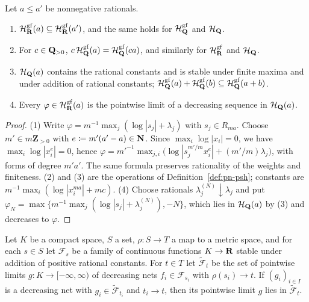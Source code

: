 \begin{lemma}\label{lem:bj-fs-basic}
\leanok
{}
Let $a\le a'$ be nonnegative rationals.
\begin{enumerate}
\item $\mathcal H^{\mathrm{gf}}_{\mathbf{R}}(a)\subseteq\mathcal H^{\mathrm{gf}}_{\mathbf{R}}(a')$, and the same holds for
$\mathcal H^{\mathrm{gf}}_{\mathbf{Q}}$ and $\mathcal H_{\mathbf{Q}}$.
\item For $c\in\mathbf{Q}_{>0}$, $c\,\mathcal H^{\mathrm{gf}}_{\mathbf{Q}}(a)=\mathcal H^{\mathrm{gf}}_{\mathbf{Q}}(ca)$, and similarly for
$\mathcal H^{\mathrm{gf}}_{\mathbf{R}}$ and $\mathcal H_{\mathbf{Q}}$.
\item $\mathcal H_{\mathbf{Q}}(a)$ contains the rational constants and is stable under finite maxima and under
addition of rational constants; $\mathcal H^{\mathrm{gf}}_{\mathbf{Q}}(a)+\mathcal H^{\mathrm{gf}}_{\mathbf{Q}}(b)\subseteq
\mathcal H^{\mathrm{gf}}_{\mathbf{Q}}(a+b)$.
\item Every $\varphi\in\mathcal H^{\mathrm{gf}}_{\mathbf{R}}(a)$ is the pointwise limit of a decreasing sequence
in $\mathcal H_{\mathbf{Q}}(a)$.
\end{enumerate}
\end{lemma}

\begin{proof}
(1) Write $\varphi=m^{-1}\max_j(\log|s_j|+\lambda_j)$ with $s_j\in R_{ma}$. Choose $m'\in m\mathbf{Z}_{>0}$ with
$e\coloneqq m'(a'-a)\in\mathbf{N}$. Since $\max_i\log|x_i|=0$, we have $\max_i\log|x_i^e|=0$, hence
$\varphi=m'^{-1}\max_{j,i}\bigl(\log|s_j^{m'/m}x_i^e|+(m'/m)\lambda_j\bigr)$, with forms of degree
$m'a'$. The same formula preserves rationality of the weights and finiteness. (2) and (3) are the
operations of Definition~\ref{def:pn-psh}; constants are $m^{-1}\max_i(\log|x_i^{ma}|+mc)$. (4) Choose
rationals $\lambda_j^{(N)}\downarrow\lambda_j$ and put
$\varphi_N=\max\{m^{-1}\max_j(\log|s_j|+\lambda_j^{(N)}),-N\}$, which lies in $\mathcal H_{\mathbf{Q}}(a)$ by (3)
and decreases to $\varphi$.
\end{proof}

\begin{lemma}\label{lem:bj-psh-diagonal}
\leanok
Let $K$ be a compact space, $S$ a set, $\rho\colon S\to T$ a map to a metric space, and for each
$s\in S$ let $\mathcal F_s$ be a family of continuous functions $K\to\mathbf{R}$ stable under addition of
positive rational constants. For $t\in T$ let $\widetilde{\mathcal F}_t$ be the set of pointwise limits
$g\colon K\to[-\infty,\infty)$ of decreasing nets $f_i\in\mathcal F_{s_i}$ with $\rho(s_i)\to t$. If
$(g_i)_{i\in I}$ is a decreasing net with $g_i\in\widetilde{\mathcal F}_{t_i}$ and $t_i\to t$, then its
pointwise limit $g$ lies in $\widetilde{\mathcal F}_t$.
\end{lemma}

